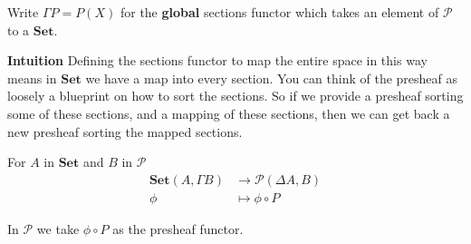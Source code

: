 \documentclass{article}
\begin{document}
Write $\Gamma P = P(X)$ for the \textbf{global} sections functor which takes an element of $\mathcal{P}$ to a $\mathbf{Set}$.

\textbf {Intuition} Defining the sections functor to map the entire space in this way means in $\mathbf{Set}$ we have a map into every section. You can think of the presheaf as loosely a blueprint on how to sort the sections. So if we provide a presheaf sorting some of these sections, and a mapping of these sections, then we can get back a new presheaf sorting the mapped sections.

For $A$ in $\mathbf{Set}$ and $B$ in $\mathcal{P}$
\begin{align*}
  \mathbf{Set}(A, \Gamma B) &\rightarrow \mathcal{P}(\Delta A, B)\\
  \phi &\mapsto \phi \circ P
\end{align*}

In $\mathcal{P}$ we take $\phi \circ P$ as the presheaf functor.
\end{document}
